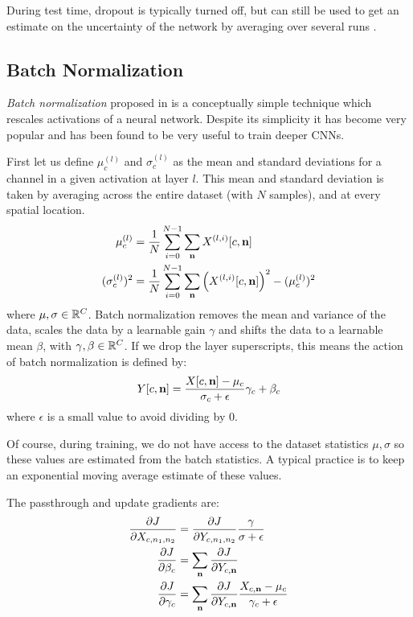 During test time, dropout is typically turned off, but can still be
used to get an estimate on the uncertainty of the network by averaging over
several runs \cite{gal_dropout_2016}.

\subsection{Batch Normalization}
\emph{Batch normalization} proposed in \cite{ioffe_batch_2015} is a conceptually
simple technique which rescales activations of a neural network. Despite its
simplicity it has become very popular and has been found to be very useful to
train deeper CNNs.

First let us define $\mu_c^{(l)}$ and $\sigma_c^{(l)}$ as the mean and standard deviations
for a channel in a given activation at layer $l$. This mean and standard deviation is taken by
averaging across the entire dataset (with $N$ samples), and at every spatial location.
\begin{align}
  \mu_c^{(l)} &= \frac{1}{N}\sum_{i=0}^{N-1} \sum_\nn X^{(l, i)}[c, \nn] \\
  (\sigma_c^{(l)})^2 &=  \frac{1}{N} \sum_{i=0}^{N-1} \sum_\nn \left(X^{(l, i)}[c, \nn]\right)^2 - (\mu^{(l)}_c)^2
\end{align}
where $\mu, \sigma \in \reals[C]$.
Batch normalization removes the mean and variance of the data, scales the data
by a learnable gain $\gamma$ and shifts the data to a learnable mean $\beta$,
with $\gamma, \beta \in \reals[C]$. If we drop the layer superscripts, this
means the action of batch normalization is defined by:
\begin{equation}
  Y[c, \nn] = \frac{X[c, \nn] - \mu_c}{\sigma_c + \epsilon}\gamma_c + \beta_c
\end{equation}
where $\epsilon$ is a small value to avoid dividing by 0.

Of course, during training, we do not have access to the dataset statistics $\mu, \sigma$
so these values are estimated from the batch statistics. A typical practice
is to keep an exponential moving average estimate of these values.

The passthrough and update gradients are:
\begin{align}
  \dydx{J}{X_{c, n_1, n_2}} &= \dydx{J}{Y_{c, n_1, n_2}}\frac{\gamma}{\sigma + \epsilon}\\
  \dydx{J}{\beta_c} &=  \sum_\nn \dydx{J}{Y_{c, \nn}}\\
  \dydx{J}{\gamma_c} &= \sum_\nn \dydx{J}{Y_{c, \nn}}\frac{X_{c, \nn} - \mu_c}{\gamma_c + \epsilon}
\end{align}

